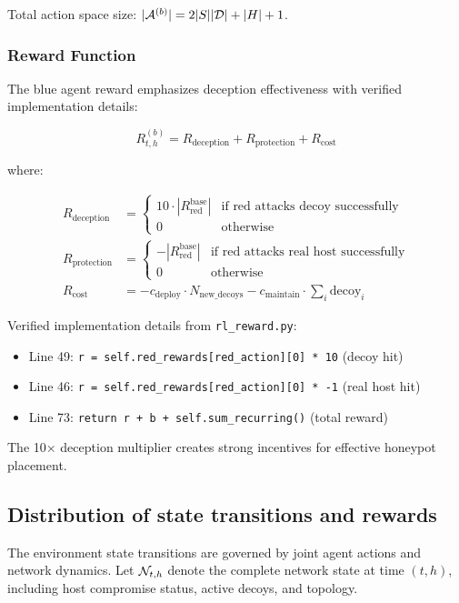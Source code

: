 \documentclass[11pt]{article}
\theoremstyle{definition}
\theoremstyle{plain}
\begin{document}
Total action space size: $|\mathcal{A}^{(b)}| = 2|S||\mathcal{D}| + |H| + 1$.

\subsubsection{Reward Function}
The blue agent reward emphasizes deception effectiveness with verified implementation details:

\begin{equation}
R_{t,h}^{(b)} = R_{\text{deception}} + R_{\text{protection}} + R_{\text{cost}}
\end{equation}

where:

\begin{align}
R_{\text{deception}} &= \begin{cases}
10 \cdot |R_{\text{red}}^{\text{base}}| & \text{if red attacks decoy successfully} \\
0 & \text{otherwise}
\end{cases} \\
R_{\text{protection}} &= \begin{cases}
-|R_{\text{red}}^{\text{base}}| & \text{if red attacks real host successfully} \\
0 & \text{otherwise}
\end{cases} \\
R_{\text{cost}} &= -c_{\text{deploy}} \cdot N_{\text{new\_decoys}} - c_{\text{maintain}} \cdot \sum_{i} \text{decoy}_i
\end{align}

Verified implementation details from \texttt{rl\_reward.py}:
\begin{itemize}
    \item Line 49: \texttt{r = self.red\_rewards[red\_action][0] * 10} (decoy hit)
    \item Line 46: \texttt{r = self.red\_rewards[red\_action][0] * -1} (real host hit)
    \item Line 73: \texttt{return r + b + self.sum\_recurring()} (total reward)
\end{itemize}

The 10× deception multiplier creates strong incentives for effective honeypot placement.

\subsection{Distribution of state transitions and rewards}

The environment state transitions are governed by joint agent actions and network dynamics. Let $\mathcal{N}_{t,h}$ denote the complete network state at time $(t,h)$, including host compromise status, active decoys, and topology.
\end{document}
